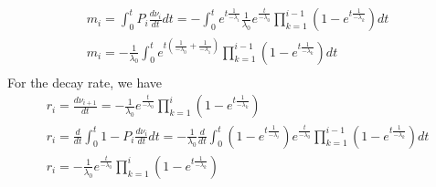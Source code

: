 \documentclass[12pt]{article}
\begin{document}
\begin{equation}
\begin{split}
m_i = \int_0^t P_i\frac{d\nu_i}{dt}dt = -\int_0^t e^{t\frac{1}{-\lambda_i}}\frac{1}{\lambda_0}e^{\frac{t}{-\lambda_0}}\prod_{k=1}^{i-1} (1-e^{t\frac{1}{-\lambda_k}})dt\\
m_i = -\frac{1}{\lambda_0}\int_0^te^{t(\frac{1}{-\lambda_0}+\frac{1}{-\lambda_1})}\prod_{k=1}^{i-1} (1-e^{t\frac{1}{-\lambda_k}})dt \\
\end{split}
\end{equation}
For the decay rate, we have
\begin{equation}
\begin{split}
r_i = \frac{d\nu_{i+1}}{dt} = -\frac{1}{\lambda_0}e^{\frac{t}{-\lambda_0}}\prod_{k=1}^{i} (1-e^{t\frac{1}{-\lambda_k}}) \\
r_i = \frac{d}{dt}\int_0^t 1-P_i\frac{d\nu_i}{dt}dt = -\frac{1}{\lambda_0}\frac{d}{dt}\int_0^t (1-e^{t\frac{1}{-\lambda_i}})e^{\frac{t}{-\lambda_0}}\prod_{k=1}^{i-1} (1-e^{t\frac{1}{-\lambda_k}})dt\\
r_i =  -\frac{1}{\lambda_0}e^{\frac{t}{-\lambda_0}}\prod_{k=1}^{i} (1-e^{t\frac{1}{-\lambda_k}})\\
\end{split}
\end{equation}
\end{document}
